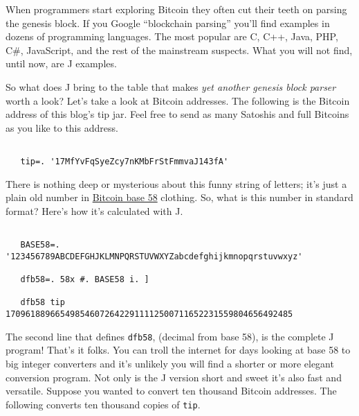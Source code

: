 When programmers start exploring Bitcoin they often cut their teeth on
parsing the genesis block. If you Google ``blockchain parsing'' you'll
find examples in dozens of programming languages. The most popular are
C, C++, Java, PHP, C\#, JavaScript, and the rest of the mainstream
suspects. What you will not find, until now, are J examples.

So what does J bring to the table that makes \emph{yet another genesis
block parser} worth a look? Let's take a look at Bitcoin addresses. The
following is the Bitcoin address of this blog's tip jar. Feel free to
send as many Satoshis and full Bitcoins as you like to this address.

\begin{tcolorbox}[breakable, size=fbox, boxrule=1pt, pad at break*=1mm,colback=cellbackground, colframe=cellborder]
\begin{lstlisting}[language=jdoc, frame=single,framerule=0pt,label=lst:scr4754X0a]

   tip=. '17MfYvFqSyeZcy7nKMbFrStFmmvaJ143fA'
\end{lstlisting}
\end{tcolorbox}

There is nothing deep or mysterious about this funny string of letters;
it's just a plain old number in
\href{https://en.bitcoin.it/wiki/Base58Check_encoding}{Bitcoin base 58}
clothing. So, what is this number in standard format? Here's how it's
calculated with J.

\begin{tcolorbox}[breakable, size=fbox, boxrule=1pt, pad at break*=1mm,colback=cellbackground, colframe=cellborder]
\begin{lstlisting}[language=jdoc, frame=single,framerule=0pt,label=lst:scr4754X0b]

   BASE58=. '123456789ABCDEFGHJKLMNPQRSTUVWXYZabcdefghijkmnopqrstuvwxyz'
 
   dfb58=. 58x #. BASE58 i. ]
 
   dfb58 tip
1709618896654985460726422911112500711652231559804656492485
\end{lstlisting}
\end{tcolorbox}

The second line that defines \texttt{dfb58}, (decimal from base 58), is
the complete J program! That's it folks. You can troll the internet for
days looking at base 58 to big integer converters and it's unlikely you
will find a shorter or more elegant conversion program. Not only is the
J version short and sweet it's also fast and versatile. Suppose you
wanted to convert ten thousand Bitcoin addresses. The following converts
ten thousand copies of \texttt{tip}.

